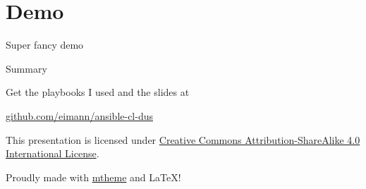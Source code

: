 \documentclass[10pt, compress]{beamer}
\begin{document}
\section{Demo}

\begin{frame}{Super fancy demo}
  \begin{figure}
  \end{figure}
\end{frame}


\begin{frame}{Summary}

  Get the playbooks I used and the slides at

  \begin{center}\url{github.com/eimann/ansible-cl-dus}\end{center}

  This presentation is licensed under
  \href{http://creativecommons.org/licenses/by-sa/4.0/}{Creative Commons
  Attribution-ShareAlike 4.0 International License}.

  \begin{center}\ccbysa\end{center}
  
  Proudly made with \href{https://github.com/matze/mtheme}{mtheme} and \LaTeX{}! 

\end{frame}
\end{document}
